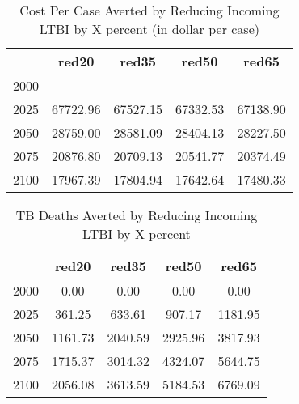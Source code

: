 \documentclass{article}
\begin{document}
\begin{table}[ht]
\centering
\begin{tabular}{|r|cccc|}
  \hline
 & red20 & red35 & red50 & red65 \\ 
  \hline
2000 &  &  &  &  \\ 
  2025 & 67722.96 & 67527.15 & 67332.53 & 67138.90 \\ 
  2050 & 28759.00 & 28581.09 & 28404.13 & 28227.50 \\ 
  2075 & 20876.80 & 20709.13 & 20541.77 & 20374.49 \\ 
  2100 & 17967.39 & 17804.94 & 17642.64 & 17480.33 \\ 
   \hline
\end{tabular}
\caption{Cost Per Case Averted by Reducing Incoming LTBI by X percent (in dollar per case)} 
\end{table}
\begin{table}[ht]
\centering
\begin{tabular}{|r|cccc|}
  \hline
 & red20 & red35 & red50 & red65 \\ 
  \hline
2000 & 0.00 & 0.00 & 0.00 & 0.00 \\ 
  2025 & 361.25 & 633.61 & 907.17 & 1181.95 \\ 
  2050 & 1161.73 & 2040.59 & 2925.96 & 3817.93 \\ 
  2075 & 1715.37 & 3014.32 & 4324.07 & 5644.75 \\ 
  2100 & 2056.08 & 3613.59 & 5184.53 & 6769.09 \\ 
   \hline
\end{tabular}
\caption{TB Deaths Averted by Reducing Incoming LTBI by X percent} 
\end{table}
\end{document}
